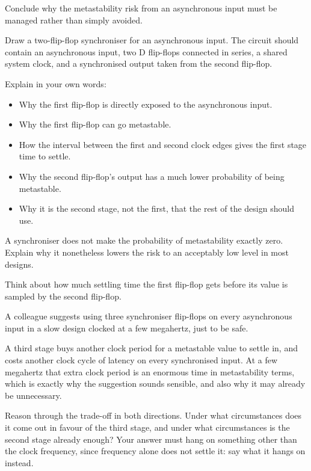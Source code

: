 Conclude why the metastability risk from an asynchronous input must be managed rather than simply
avoided.


\label{c4:ex:chain}
Draw a two-flip-flop synchroniser for an asynchronous input. The circuit should contain an
asynchronous input, two D flip-flops connected in series, a shared system clock, and a synchronised
output taken from the second flip-flop.

Explain in your own words:
\begin{itemize}
  \item Why the first flip-flop is directly exposed to the asynchronous input.
  \item Why the first flip-flop can go metastable.
  \item How the interval between the first and second clock edges gives the first stage time to
    settle.
  \item Why the second flip-flop's output has a much lower probability of being metastable.
  \item Why it is the second stage, not the first, that the rest of the design should use.
\end{itemize}

A synchroniser does not make the probability of metastability exactly zero. Explain why it
nonetheless lowers the risk to an acceptably low level in most designs.

\note[Hint]Think about how much settling time the first flip-flop gets before its value is sampled
by the second flip-flop.

\label{c4:ex:third}
A colleague suggests using three synchroniser flip-flops on every asynchronous input in a slow
design clocked at a few megahertz, just to be safe.

A third stage buys another clock period for a metastable value to settle in, and costs another
clock cycle of latency on every synchronised input. At a few megahertz that extra clock period is
an enormous time in metastability terms, which is exactly why the suggestion sounds sensible, and
also why it may already be unnecessary.

 Reason through the trade-off in both directions. Under what circumstances does it come
out in favour of the third stage, and under what circumstances is the second stage already enough?
Your answer must hang on something other than the clock frequency, since frequency alone does not
settle it: say what it hangs on instead.

